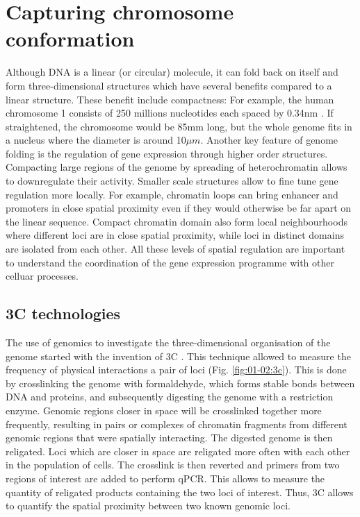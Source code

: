 \section{Capturing chromosome conformation}

Although DNA is a linear (or circular) molecule, it can fold back on itself and form three-dimensional structures which have several benefits compared to a linear structure. These benefit include compactness: For example, the human chromosome 1 consists of 250 millions nucleotides each spaced by 0.34nm \cite {langridgeMolecularConfigurationDeoxyribonucleic1960}. If straightened, the chromosome would be 85mm long, but the whole genome fits in a nucleus where the diameter is around 10$\mu m$. Another key feature of genome folding is the regulation of gene expression through higher order structures. Compacting large regions of the genome by spreading of \Gls{heterochromatin} allows to downregulate their activity. Smaller scale structures allow to fine tune gene regulation more locally. For example, \Gls{chromatin} loops can bring enhancer and promoters in close spatial proximity even if they would otherwise be far apart on the linear sequence. Compact chromatin domain also form local neighbourhoods where different loci are in close spatial proximity, while loci in distinct domains are isolated from each other. All these levels of spatial regulation are important to understand the coordination of the gene expression programme with other celluar processes.

\subsection{3C technologies}

The use of genomics to investigate the three-dimensional organisation of the genome started with the invention of \acrfull{3C} \cite{dekkerCapturingChromosomeConformation2002}. This technique allowed to measure the frequency of physical interactions a pair of loci (Fig. \ref{fig:01-02:3c}). This is done by crosslinking the genome with formaldehyde, which forms stable bonds between DNA and proteins, and subsequently digesting the genome with a restriction enzyme. Genomic regions closer in space will be crosslinked together more frequently, resulting in pairs or complexes of chromatin fragments from different genomic regions that were spatially interacting. The digested genome is then religated. Loci which are closer in space are religated more often with each other in the population of cells. The crosslink is then reverted and primers from two regions of interest are added to perform qPCR. This allows to measure the quantity of religated products containing the two loci of interest. Thus, 3C allows to quantify the spatial proximity between two known genomic loci.

